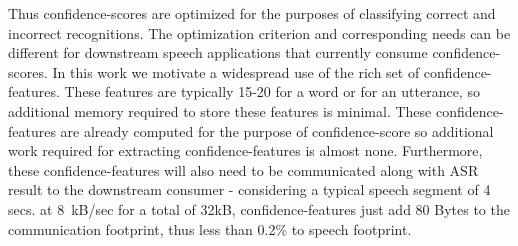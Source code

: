 Thus confidence-scores are optimized for the purposes of classifying correct and incorrect recognitions. The optimization criterion and corresponding needs can be different for downstream speech applications that currently consume confidence-scores. In this work we motivate a widespread use of the rich set of confidence-features. These features are typically 15-20 for a word or for an utterance, so additional memory required to store these features is minimal. These confidence-features are already computed for the purpose of confidence-score so additional work required for extracting confidence-features is almost none. Furthermore, these confidence-features will also need to be communicated along with ASR result to the downstream consumer - considering a typical speech segment of 4 secs. at 8~kB/sec for a total of 32kB, confidence-features just add 80 Bytes to the communication footprint, thus less than 0.2\% to speech footprint.
